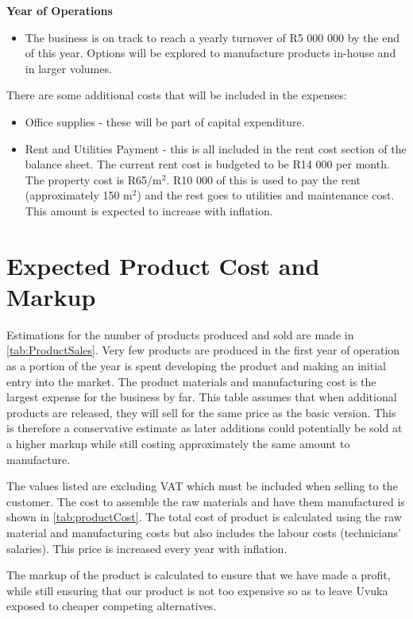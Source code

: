 {\bfseries {} Year of Operations}
\begin{itemize}
\item The business is on track to reach a yearly turnover of R5 000 000 by the end of this year. Options will be explored to manufacture products in-house and in larger volumes.
\end{itemize}

There are some additional costs that will be included in the expenses:
\begin{itemize}
\item Office supplies - these will be part of capital expenditure.
\item Rent and Utilities Payment - this is all included in the rent cost section of the balance sheet. The current rent cost is budgeted to be R14 000 per month. The property cost is R65/m$^2$. R10 000 of this is used to pay the rent (approximately 150 m$^2$) and the rest goes to utilities and maintenance cost. This amount is expected to increase with inflation. 
\end{itemize}

\section{Expected Product Cost and Markup}
Estimations for the number of products produced and sold are made in \cref{tab:ProductSales}. Very few products are produced in the first year of operation as a portion of the year is spent developing the product and making an initial entry into the market. The product materials and manufacturing cost is the largest expense for the business by far. This table assumes that when additional products are released, they will sell for the same price as the basic version. This is therefore a conservative estimate as later additions could potentially be sold at a higher markup while still costing approximately the same amount to manufacture.

The values listed are excluding VAT which must be included when selling to the customer. The cost to assemble the raw materials and have them manufactured is shown in \cref{tab:productCost}. The total cost of product is calculated using the raw material and manufacturing costs but also includes the labour costs (technicians' salaries). This price is increased every year with inflation. 

The markup of the product is calculated to ensure that we have made a profit, while still ensuring that our product is not too expensive so as to leave Uvuka exposed to cheaper competing alternatives.

